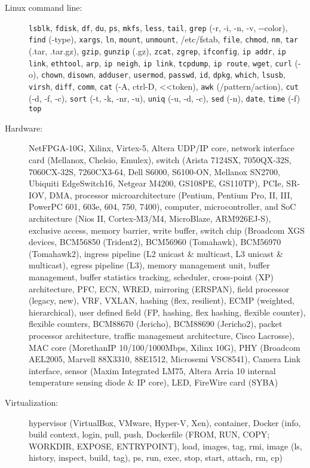 \documentclass[letterpaper,11pt]{article}
\begin{document}
\begin{description}
\item[Linux command line:] {\tt lsblk}, {\tt fdisk}, {\tt df}, {\tt du},
{\tt ps},
{\tt mkfs}, {\tt less}, {\tt tail}, {\tt grep} (-r, -i, -n, -v, -{}-color), {\tt find} (-type), {\tt xargs}, {\tt ln}, {\tt mount}, {\tt unmount}, /etc/fstab,
{\tt file}, {\tt chmod}, {\tt nm},
{\tt tar} (.tar, .tar.gz), {\tt gzip}, {\tt gunzip} (.gz), {\tt zcat}, {\tt zgrep},
{\tt ifconfig}, {\tt ip addr}, {\tt ip link}, {\tt ethtool}, {\tt arp}, {\tt ip neigh}, {\tt ip link}, {\tt tcpdump}, {\tt ip route}, {\tt wget}, {\tt curl} (-o),
{\tt chown}, {\tt disown}, {\tt adduser}, {\tt usermod}, {\tt passwd}, {\tt id},
{\tt dpkg},
{\tt which},
{\tt lsusb},
{\tt virsh},
{\tt diff}, {\tt comm},
{\tt cat} (-A, ctrl-D, \textless\textless token), {\tt awk} (/pattern/action), {\tt cut} (-d, -f, -c),
{\tt sort} (-t, -k, -nr, -u), {\tt uniq} (-u, -d, -c), {\tt sed} (-n),
{\tt date}, {\tt time} (-f)
{\tt top}

\item[Hardware:] NetFPGA-10G, Xilinx, Virtex-5, Altera UDP/IP core, network interface card (Mellanox, Chelsio, Emulex),
switch (Arista 7124SX, 7050QX-32S, 7060CX-32S, 7260CX3-64, Dell S6000, S6100-ON, Mellanox SN2700,
Ubiquiti EdgeSwitch16, Netgear M4200, GS108PE, GS110TP), PCIe, SR-IOV, DMA,
processor microarchitecture (Pentium, Pentium Pro, II, III, PowerPC 601, 603e, 604, 750, 7400),
computer, microcontroller, and SoC architecture (Nios II, Cortex-M3/M4, MicroBlaze, ARM926EJ-S),
exclusive access, memory barrier, write buffer,
switch chip (Broadcom XGS devices, BCM56850 (Trident2), BCM56960 (Tomahawk), BCM56970 (Tomahawk2),
ingress pipeline (L2 unicast \& multicast, L3 unicast \& multicast), egress pipeline (L3),
memory management unit, buffer management, buffer statistics tracking, scheduler,
cross-point (XP) architecture, PFC, ECN, WRED, mirroring (ERSPAN), field processor (legacy, new),
VRF, VXLAN, hashing (flex, resilient), ECMP (weighted, hierarchical),
user defined field (FP, hashing, flex hashing, flexible counter), flexible counters,
BCM88670 (Jericho), BCM88690 (Jericho2), packet processor architecture, traffic management architecture,
Cisco Lacrosse),
MAC core (MorethanIP 10/100/1000Mbps, Xilinx 10G),
PHY (Broadcom AEL2005, Marvell 88X3310, 88E1512, Microsemi VSC8541), Camera Link interface, sensor (Maxim Integrated LM75,
Altera Arria 10 internal temperature sensing diode \& IP core), LED,
FireWire card (SYBA)

\item[Virtualization:] hypervisor (VirtualBox, VMware, Hyper-V, Xen), container, Docker (info,
build context, login, pull, push,
Dockerfile (FROM, RUN, COPY; WORKDIR, EXPOSE, ENTRYPOINT),
load, images, tag, rmi, image (ls, history, inspect, build, tag),
ps, run, exec, stop, start, attach, rm,
cp)


\end{description}
\end{document}
